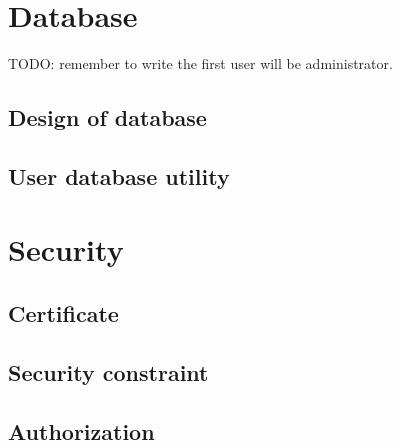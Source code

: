 \section{Database}
\label{sec:WebApplication:Database}

\textsf{TODO: remember to write the first user will be administrator.}


\subsection{Design of database}
\label{sec:WebApplication:Database:DesignOfDatabase}

\subsection{User database utility}
\label{sec:WebApplication:Database:UserDatabaseUtility}

\section{Security}
\label{sec:WebApplication:Security}

\subsection{Certificate}
\label{sec:WebApplication:Security:Certificate}

\subsection{Security constraint}
\label{sec:WebApplication:Security:SecurityConstraint}

\subsection{Authorization}
\label{sec:WebApplication:Authorization}


